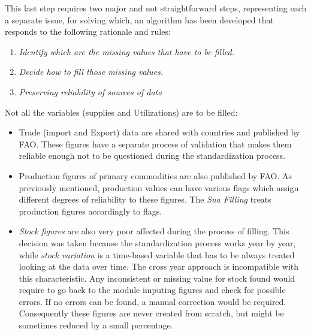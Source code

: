 \documentclass[]{article}
\providecommand{\tightlist}{%
  \setlength{\itemsep}{0pt}\setlength{\parskip}{0pt}}
\begin{document}
This last step requires two major and not straightforward steps,
representing each a separate issue, for solving which, an algorithm has
been developed that responds to the following rationale and rules:

\begin{enumerate}
\def\labelenumi{\arabic{enumi}.}
\tightlist
\item
  \emph{Identify which are the missing values that have to be filled.}
\item
  \emph{Decide how to fill those missing values.}
\item
  \emph{Preserving reliability of sources of data}
\end{enumerate}

Not all the variables (supplies and Utilizations) are to be filled:

\begin{itemize}
\tightlist
\item
  Trade (import and Export) data are shared with countries and published
  by FAO. These figures have a separate process of validation that makes
  them reliable enough not to be questioned during the standardization
  process.
\item
  Production figures of primary commodities are also published by FAO.
  As previously mentioned, production values can have various flags
  which assign different degrees of reliability to these figures. The
  \emph{Sua Filling} treats production figures accordingly to flags.
\item
  \emph{Stock figures} are also very poor affected during the process of
  filling. This decision was taken because the standardization process
  works year by year, while \emph{stock variation} is a time-based
  variable that has to be always treated looking at the data over time.
  The cross year approach is incompatible with this characteristic. Any
  inconsistent or missing value for stock found would require to go back
  to the module imputing figures and check for possible errors. If no
  errors can be found, a manual correction would be required.
  Consequently these figures are never created from scratch, but might
  be sometimes reduced by a small percentage.
\end{itemize}
\end{document}
